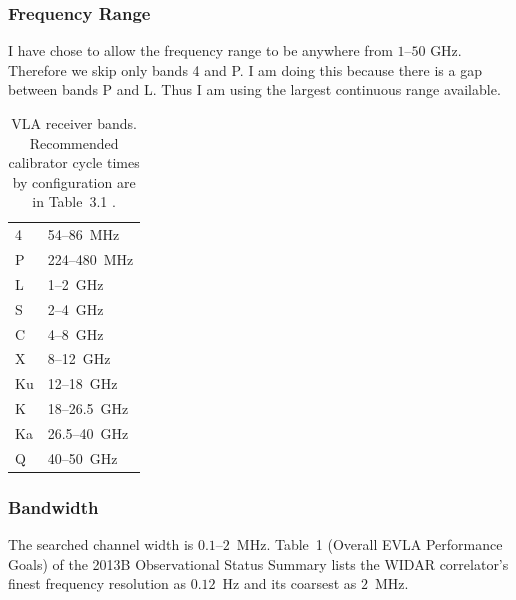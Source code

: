 \documentclass[11pt]{article}
\begin{document}
\subsubsection{Frequency Range}
\label{sec:param-frequency-range}

I have chose to allow the frequency range to be anywhere from $1$--$50$ GHz.
Therefore we skip only bands 4 and P.
I am doing this because there is a gap between bands P and L.
Thus I am using the largest continuous range available.

\begin{table}[H]
\centering
\begin{tabular}{ll}
4  & 54--86~MHz \\
P  & 224--480~MHz \\
L  & 1--2~GHz \\
S  & 2--4~GHz \\
C  & 4--8~GHz \\
X  & 8--12~GHz \\
Ku & 12--18~GHz \\
K  & 18--26.5~GHz \\
Ka & 26.5--40~GHz \\
Q  & 40--50~GHz \\
\end{tabular}
\caption{VLA receiver bands. Recommended calibrator cycle times by configuration are in Table~3.1 \cite{nrao-vla-obsguide}.}
\label{tab:vla-bands}
\end{table}

\subsubsection{Bandwidth}
\label{sec:param-bandwidth}

The searched channel width is $0.1$--$2$~MHz.
Table~1 (Overall EVLA Performance Goals) of the 2013B Observational Status Summary \cite{nrao-vla-oss2013b} lists the WIDAR correlator's finest frequency resolution as $0.12$~Hz and its coarsest as $2$~MHz.



\end{document}
